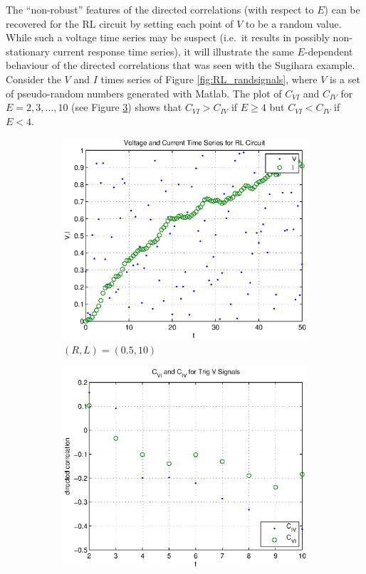 \documentclass[a4paper,11pt]{article}
\begin{document}
The ``non-robust'' features of the directed correlations (with respect to $E$) can be recovered for the RL circuit by setting each point of $V$ to be a random value.  While such a voltage time series may be suspect (i.e.\ it results in possibly non-stationary current response time series), it will illustrate the same $E$-dependent behaviour of the directed correlations that was seen with the Sugihara example.  Consider the $V$ and $I$ times series of Figure \ref{fig:RL_randsignals}, where $V$ is a set of pseudo-random numbers generated with Matlab.  The plot of $C_{VI}$ and $C_{IV}$ for $E=2,3,\ldots,10$ (see Figure \ref{fig:RL_randsignalsCCM}) shows that $C_{VI}>C_{IV}$ if $E\ge 4$ but $C_{VI}<C_{IV}$ if $E<4$.
\begin{figure}[h!t]
\centering
\begin{subfigure}[b]{0.4\textwidth}
\label{fig:RL_randsignals.eps}
\includegraphics[scale=0.55]{RL_randsignals.eps}
\caption{$(R,L) = (0.5,10)$}
\end{subfigure}
\begin{subfigure}[b]{0.4\textwidth}
\label{fig:RL_randsignalsCCM}
\includegraphics[scale=0.55]{RL_randsignalsCCM.eps}

\end{subfigure}
\end{figure}
\end{document}
